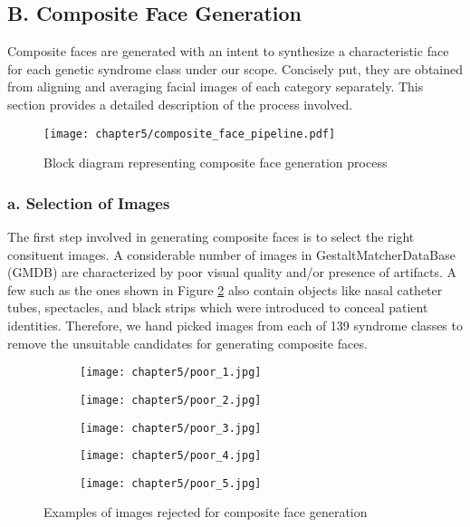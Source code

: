 \documentclass[../report.tex]{subfiles}
\begin{document}
    \subsection{B. Composite Face Generation}
    Composite faces are generated with an intent to synthesize a characteristic face for each genetic syndrome class under our scope. Concisely put, they are obtained from aligning and averaging facial images of each category separately. This section provides a detailed description of the process involved.
       \begin{figure}[H]
    	\hspace*{-0.5cm}      
    	\texttt{[image: chapter5/composite\_face\_pipeline.pdf]}
    	\caption{Block diagram representing composite face generation process}
    	\label{fig_gm_pipeline}
    \end{figure}
    
    \subsubsection{a. Selection of Images}
    The first step involved in generating composite faces is to select the right consituent images. A considerable number of images in GestaltMatcherDataBase (GMDB) are characterized by poor visual quality and/or presence of artifacts. A few such as the ones shown in Figure \ref{fig_gmdb_poorq} also contain objects like nasal catheter tubes, spectacles, and black strips which were introduced to conceal patient identities. Therefore, we hand picked images from each of 139 syndrome classes to remove the unsuitable candidates for generating composite faces.
    
       \begin{figure}[H]
    	   	\centering
    	   	\begin{subfigure}[b]{0.17\textwidth}
    		   		\centering
    		   		\texttt{[image: chapter5/poor\_1.jpg]}
    		   	\end{subfigure}
    	   	\begin{subfigure}[b]{0.17\textwidth}
    		   		\centering
    		   		\texttt{[image: chapter5/poor\_2.jpg]}
    		   	\end{subfigure}
    	   		\begin{subfigure}[b]{0.17\textwidth}
    	   		\centering
    	   		\texttt{[image: chapter5/poor\_3.jpg]}
    	   	\end{subfigure}
       		\begin{subfigure}[b]{0.17\textwidth}
       			\centering
       			\texttt{[image: chapter5/poor\_4.jpg]}
       		\end{subfigure}
       			\begin{subfigure}[b]{0.17\textwidth}
       			\centering
       			\texttt{[image: chapter5/poor\_5.jpg]}
       		\end{subfigure}
    	   	\caption{Examples of images rejected for composite face generation}
    	   	\label{fig_gmdb_poorq}
    	   \end{figure}
\end{document}
